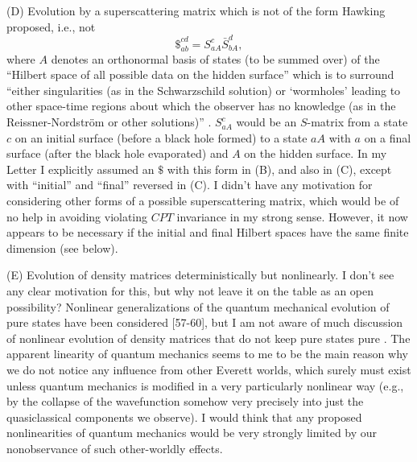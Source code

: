 \documentclass[12pt]{article}
\begin{document}
     (D) Evolution by a superscattering matrix which is not of the
form Hawking
proposed, i.e., not
     	\begin{equation}
	\$_{ab}^{cd} = S_{aA}^c \bar{S}_{bA}^d,
	\end{equation}
where $A$ denotes an orthonormal basis of states (to be summed over)
of the
``Hilbert space of all possible data on the hidden surface'' which is
to
surround ``either singularities (as in the Schwarzschild solution) or
`wormholes' leading to other space-time regions about which the
observer has no
knowledge (as in the Reissner-Nordstr\"{o}m or other solutions)''
\cite{Haw76}.
$S_{aA}^c$ would be an $S$-matrix from a state $c$ on an initial
surface
(before a black hole formed) to a state $aA$ with $a$ on a final
surface (after
the black hole evaporated) and $A$ on the hidden surface.  In my
Letter I
explicitly assumed  an $\$$ with this form in (B), and also in (C),
except with
``initial'' and ``final'' reversed in (C).  I didn't have any
motivation for
considering other forms of a possible superscattering matrix, which
would be of
no help in avoiding violating $CPT$ invariance in my strong sense.
However,
it now appears to be necessary if the initial and final Hilbert
spaces have the
same finite dimension (see below).

     (E) Evolution of density matrices deterministically but
nonlinearly.
I don't see any clear motivation for this, but why not leave it on
the table as
an open possibility?  Nonlinear generalizations of the quantum
mechanical
evolution of pure states have been considered [57-60],
but I am not aware of much discussion of nonlinear evolution of
density
matrices that do not keep pure states pure \cite{PreSB}.
The apparent linearity of quantum mechanics
seems to me to be the main reason why we do not notice any influence
from
other Everett worlds, which surely must exist unless quantum
mechanics is
modified in a very particularly nonlinear way (e.g., by the collapse
of the
wavefunction somehow very precisely into just the quasiclassical
components
we observe).  I would think that any proposed nonlinearities of
quantum
mechanics would be very strongly limited by our nonobservance of such
other-worldly effects.
\end{document}
